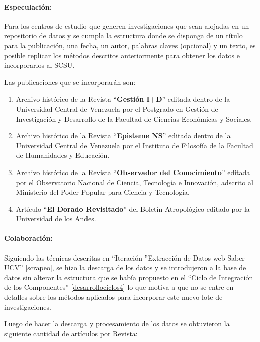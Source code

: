 \documentclass[
  12pt,
  openany]{book}
\begin{document}
\hypertarget{dcseisespe}{%
\paragraph{Especulación:}\label{dcseisespe}}

Para los centros de estudio que generen investigaciones que sean alojadas en un repositorio de datos y se cumpla la estructura donde se disponga de un título para la publicación, una fecha, un autor, palabras claves (opcional) y un texto, es posible replicar los métodos descritos anteriormente para obtener los datos e incorporarlos al SCSU.

Las publicaciones que se incorporarán son:

\begin{enumerate}
\def\labelenumi{\arabic{enumi}.}
\item
  Archivo histórico de la Revista ``\textbf{Gestión I+D}'' editada dentro de la Universidad Central de Venezuela por el Postgrado en Gestión de Investigación y Desarrollo de la Facultad de Ciencias Económicas y Sociales.
\item
  Archivo histórico de la Revista ``\textbf{Episteme NS}'' editada dentro de la Universidad Central de Venezuela por el Instituto de Filosofía de la Facultad de Humanidades y Educación.
\item
  Archivo histórico de la Revista ``\textbf{Observador del Conocimiento}'' editada por el Observatorio Nacional de Ciencia, Tecnología e Innovación, adscrito al Ministerio del Poder Popular para Ciencia y Tecnología.
\item
  Artículo ``\textbf{El Dorado Revisitado}'' del Boletín Atropológico editado por la Universidad de los Andes.
\end{enumerate}

\hypertarget{dcseiscola}{%
\paragraph{Colaboración:}\label{dcseiscola}}

Siguiendo las técnicas descritas en ``Iteración-''Extracción de Datos web Saber UCV'' \ref{scrapeo}, se hizo la descarga de los datos y se introdujeron a la base de datos sin alterar la estructura que se había propuesto en el ``Ciclo de Integración de los Componentes'' \ref{desarrollociclos4} lo que motiva a que no se entre en detalles sobre los métodos aplicados para incorporar este nuevo lote de investigaciones.

Luego de hacer la descarga y procesamiento de los datos se obtuvieron la siguiente cantidad de artículos por Revista:
\end{document}
